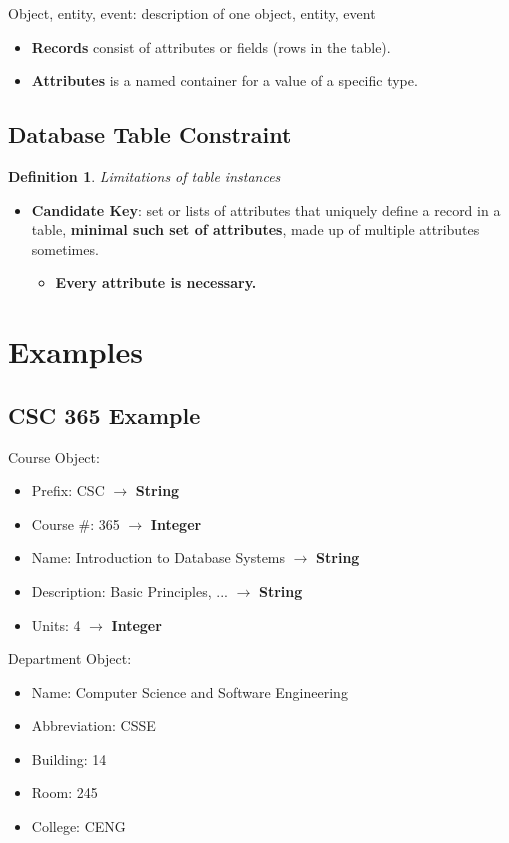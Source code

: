 \documentclass[twoside]{article}
\newtheorem{definition}[theorem]{Definition}
\begin{document}
Object, entity, event: description of one object, entity, event
\begin{itemize}
    \item \textbf{Records} consist of attributes or fields (rows in the 
    table).
    \item \textbf{Attributes} is a named container for a value of a specific type.
\end{itemize}

\subsection*{Database Table Constraint}
\begin{definition}
    Limitations of table instances
\end{definition}
\begin{itemize}
    \item \textbf{Candidate Key}: set or lists of attributes that uniquely
    define a record in a table, \textbf{minimal such set of attributes},
    made up of multiple attributes sometimes.
    \begin{itemize}
        \item \textbf{Every attribute is necessary.}
    \end{itemize}
\end{itemize}

\section*{Examples}
\subsection*{CSC 365 Example}

Course Object:
\begin{itemize}
    \item Prefix: CSC $\longrightarrow$ \textbf{String}
    \item Course \#: 365 $\longrightarrow$ \textbf{Integer}
    \item Name: Introduction to Database Systems $\longrightarrow$ \textbf{String}
    \item Description: Basic Principles, ... $\longrightarrow$ \textbf{String}
    \item Units: 4 $\longrightarrow$ \textbf{Integer}
\end{itemize}
Department Object:
\begin{itemize}
    \item Name: Computer Science and Software Engineering
    \item Abbreviation: CSSE
    \item Building: 14
    \item Room: 245
    \item College: CENG
\end{itemize}
\end{document}

